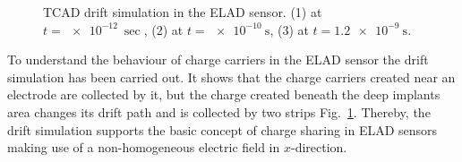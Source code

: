 \begin{figure}[t]
\begin{minipage}[h]{0.24\linewidth}
 \end{minipage}
 \begin{minipage}[h]{0.24\linewidth}
 \end{minipage}
\caption[short description here]
  {TCAD drift simulation in the ELAD sensor. (1) at $t = \SI{e-12}{\sec}$, (2) at $t = \SI{e-10}{\s}$, (3) at $t = \SI{1.2e-9}{\s}$.}
\label{fig:drift}
\end{figure} %

To understand the behaviour of charge carriers in the ELAD sensor the drift simulation has been carried out. 
It shows that the charge carriers created near an electrode are collected by it, but the charge created beneath the deep implants area %
 changes its drift path and is collected by two strips Fig.~\ref{fig:drift}.  
Thereby, the drift simulation supports the basic concept of charge sharing in ELAD sensors making use of a non-homogeneous electric field in $x$-direction. 


 